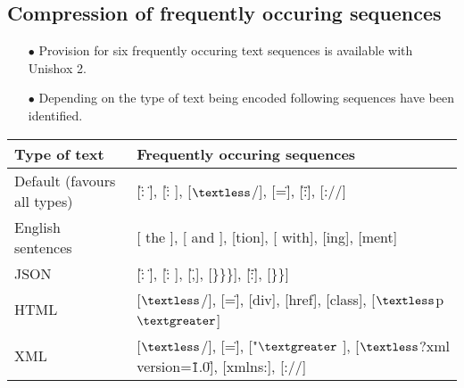 \documentclass[]{article}
\begin{document}
\subsection{Compression of frequently occuring sequences}
\begin{itemize}
	\item[$\bullet$] Provision for six frequently occuring text sequences is available with Unishox 2.
	\item[$\bullet$] Depending on the type of text being encoded following sequences have been identified.
\end{itemize}
\begin{tabular}{ | l | l |} \hline
	﻿\textbf{Type of text} & ﻿\textbf{Frequently occuring sequences} \\ \hline
	Default (favours all types) & [\": \"], [\": ], [$\textless$/], [=\"], [\":\"], [://] \\ \hline
	English sentences & [ the ], [ and ], [tion], [ with], [ing], [ment] \\ \hline
	JSON & [\": \"], [\": ], [\",], [\}\}\}], [\":\"], [\}\}] \\ \hline
	HTML & [$\textless$/], [=\"], [div], [href], [class], [$\textless$p$\textgreater$] \\ \hline
	XML & [$\textless$/], [=\"], ["$\textgreater$ ], [$\textless$?xml version=\"1.0\"], [xmlns:], [://] \\ \hline
\end{tabular}
\end{document}
